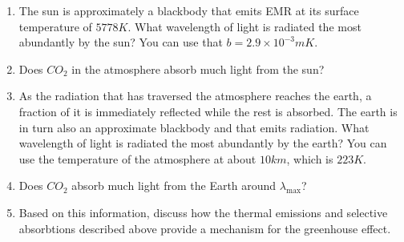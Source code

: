 \documentclass{exam}
\begin{document}
\begin{enumerate}
        \item The sun is approximately a blackbody that emits EMR at its surface temperature of $5778K$. What wavelength of light is radiated the most abundantly by the sun? You can use that $b=2.9 \times 10^{-3} mK$.



        \item Does $CO_2$ in the atmosphere absorb much light from the sun?

 

        \item  As the radiation that has traversed the atmosphere reaches the earth, a fraction of it is immediately reflected while the rest is absorbed. The earth is in turn also an approximate blackbody and that emits radiation. What wavelength of light is radiated the most abundantly by the earth? You can use the temperature of the atmosphere at about $10km$, which is $223K$.



        \item Does $CO_2$ absorb much light from the Earth around $\lambda_{\mathrm{max}}$?



        \item Based on this information, discuss how the thermal emissions and selective absorbtions described above provide a mechanism for the greenhouse effect.

 
        
    \end{enumerate}
\end{document}
